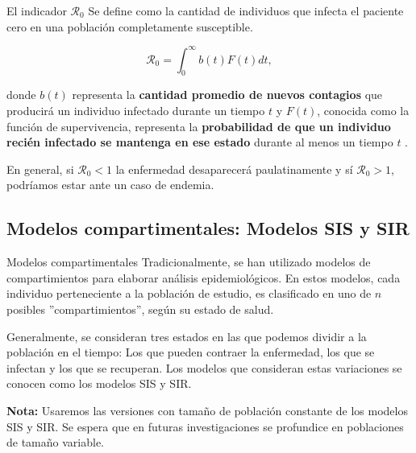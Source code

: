 \documentclass[9pt]{beamer}
\begin{document}
\begin{frame}{El indicador $\mathcal{R}_0$}
Se define como la cantidad de individuos que infecta el paciente cero en una población completamente susceptible. 

\begin{equation}\label{eq:R0}
 \mathcal{R}_0 = \int_0^\infty b(t)F(t) dt,
\end{equation}

donde $b(t)$ representa la \textbf{cantidad promedio de nuevos contagios} que producirá un individuo infectado durante un tiempo $t$ y $F(t)$, conocida como la función de supervivencia, representa la \textbf{probabilidad de que un individuo recién infectado se mantenga en ese estado} durante al menos un tiempo $t$ \cite{conceptOfR0, perspectivesOnR0}.

En general, si $\mathcal{R}_0<1$ la enfermedad desaparecerá paulatinamente y sí $\mathcal{R}_0>1$, podríamos estar ante un caso de endemia.
\end{frame}

\subsection{Modelos compartimentales: Modelos SIS y SIR}
\begin{frame}{Modelos compartimentales}
Tradicionalmente, se han utilizado modelos de compartimientos para elaborar análisis epidemiológicos. En estos modelos, cada individuo perteneciente a la población de estudio, es clasificado en uno de $n$ posibles ''compartimientos'', según su estado de salud.

Generalmente, se consideran tres estados en las que podemos dividir a la población en el tiempo: Los que pueden contraer la enfermedad, los que se infectan y los que se recuperan. Los modelos que consideran estas variaciones se conocen como los modelos SIS y SIR.

\textbf{Nota:} Usaremos las versiones con tamaño de población constante de los modelos SIS y SIR. Se espera que en futuras investigaciones se profundice en poblaciones de tamaño variable.
\end{frame}
\end{document}
